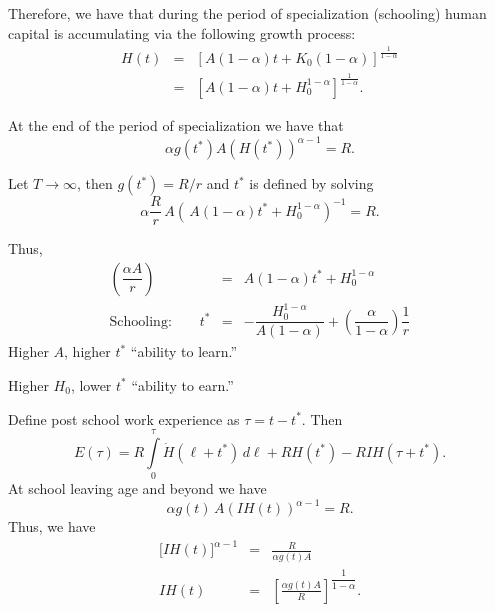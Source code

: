 \documentclass[12pt,compress,handout]{beamer}  %
\begin{document}
\begin{frame}

Therefore, we have that during the period of specialization (schooling) human
capital is accumulating via the following growth process:
\begin{eqnarray*}
    H(t) &=&[A(1-\alpha )t+K_{0}(1-\alpha )]^{\frac{1}{1-\alpha }} \\
    &=&[A(1-\alpha )t+H_{0}^{1-\alpha }]^{\frac{1}{1-\alpha }}.
\end{eqnarray*}

At the end of the period of specialization we have that
\begin{equation*}
    \alpha g(t^{*})A(H(t^{*}))^{\alpha -1}=R.
\end{equation*}

Let $T \rightarrow \infty$, then $g(t^{*}) = R/r$ and $t^{*}$ is
defined by solving
\begin{equation*}
    \alpha \dfrac{R}{r}\,
        A\left(\,A(1-\alpha )t^{*}+H_{0}^{1-\alpha}\right)^{-1}
    = R.
\end{equation*}
\end{frame}


\begin{frame}

Thus,
\begin{eqnarray*}
    \left( \dfrac{\alpha A}{r}\right)
    &=&
    A\left(1-\alpha\right)t^{*} + H_{0}^{1-\alpha}\\
    \text{Schooling:} \qquad t^{*}
    &=&
    -\dfrac{H_{0}^{1-\alpha}}{A\left(1-\alpha\right)}
    + \left(\dfrac{\alpha}{1-\alpha}\right)\dfrac{1}{r}
\end{eqnarray*}
Higher $A$, higher $t^{*}$ ``ability to learn.''

Higher $H_{0}$, lower $t^{*}$ ``ability to earn.''
\end{frame}


\begin{frame}

Define post school work experience as $\tau = t - t^{*}$. Then
\begin{equation*}
    E(\tau )
    = R\int\limits_{0}^{\tau}\dot{H}(\ell +t^{*})\,d\ell
    + RH(t^{*})-RIH(\tau + t^{*}).
\end{equation*}
At school leaving age and beyond we have
\begin{equation*}
    \alpha g(t) \,A(IH(t))^{\alpha -1}=R.
\end{equation*}
Thus, we have
\begin{eqnarray*}
    \lbrack IH(t)]^{\alpha -1}
    &=&\frac{R}{\alpha g(t)A} \\
    IH(t)
    &=&
    \left[ \frac{\alpha g(t)A}{R}\right]^{\dfrac{1}{1-\alpha}}.
\end{eqnarray*}

\end{frame}
\end{document}

